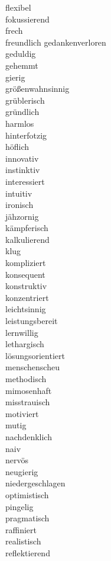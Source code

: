 \documentclass[10pt,a4paper]{article}
\begin{document}
flexibel \\
fokussierend \\
frech \\
freundlich
gedankenverloren \\
geduldig \\
gehemmt \\
gierig \\
größenwahnsinnig \\
grüblerisch \\
gründlich \\
harmlos \\
hinterfotzig \\
höflich \\
innovativ \\
instinktiv \\
interessiert \\
intuitiv \\
ironisch \\
jähzornig \\
kämpferisch \\
kalkulierend \\
klug \\
kompliziert \\
konsequent \\
konstruktiv \\
konzentriert \\
leichtsinnig \\
leistungsbereit \\
lernwillig \\
lethargisch \\
lösungsorientiert \\
menschenscheu \\
methodisch \\
mimosenhaft \\
misstrauisch \\
motiviert \\
mutig \\
nachdenklich \\
naiv \\
nervös \\
neugierig \\
niedergeschlagen \\
optimistisch \\
pingelig \\
pragmatisch \\
raffiniert \\
realistisch \\
reflektierend \\
\end{document}
